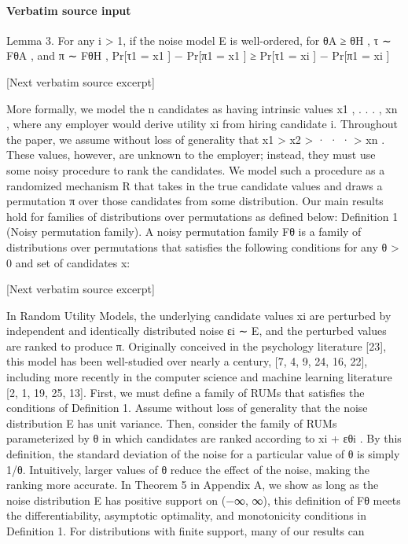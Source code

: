 \documentclass[10pt]{article}
\begin{document}
\paragraph{Verbatim source input}
\begin{ReviewVerbatim}
Lemma 3. For any i > 1, if the noise model E is well-ordered, for θA ≥ θH , τ ∼ FθA , and π ∼ FθH ,
Pr[τ1 = x1 ] − Pr[π1 = x1 ] ≥ Pr[τ1 = xi ] − Pr[π1 = xi ]

[Next verbatim source excerpt]

More formally, we model the n candidates as having intrinsic values x1 , . . . , xn , where any employer would
derive utility xi from hiring candidate i. Throughout the paper, we assume without loss of generality that
x1 > x2 > · · · > xn . These values, however, are unknown to the employer; instead, they must use some
noisy procedure to rank the candidates. We model such a procedure as a randomized mechanism R that
takes in the true candidate values and draws a permutation π over those candidates from some distribution.
Our main results hold for families of distributions over permutations as defined below:
Definition 1 (Noisy permutation family). A noisy permutation family Fθ is a family of distributions over
permutations that satisfies the following conditions for any θ > 0 and set of candidates x:

[Next verbatim source excerpt]

In Random Utility Models, the underlying candidate values xi are perturbed by independent and identically
distributed noise εi ∼ E, and the perturbed values are ranked to produce π. Originally conceived in the
psychology literature [23], this model has been well-studied over nearly a century, [7, 4, 9, 24, 16, 22],
including more recently in the computer science and machine learning literature [2, 1, 19, 25, 13].
First, we must define a family of RUMs that satisfies the conditions of Definition 1. Assume without loss of
generality that the noise distribution E has unit variance. Then, consider the family of RUMs parameterized
by θ in which candidates are ranked according to xi + εθi . By this definition, the standard deviation of the
noise for a particular value of θ is simply 1/θ. Intuitively, larger values of θ reduce the effect of the noise,
making the ranking more accurate. In Theorem 5 in Appendix A, we show as long as the noise distribution
E has positive support on (−∞, ∞), this definition of Fθ meets the differentiability, asymptotic optimality,
and monotonicity conditions in Definition 1. For distributions with finite support, many of our results can


\end{ReviewVerbatim}
\end{document}
